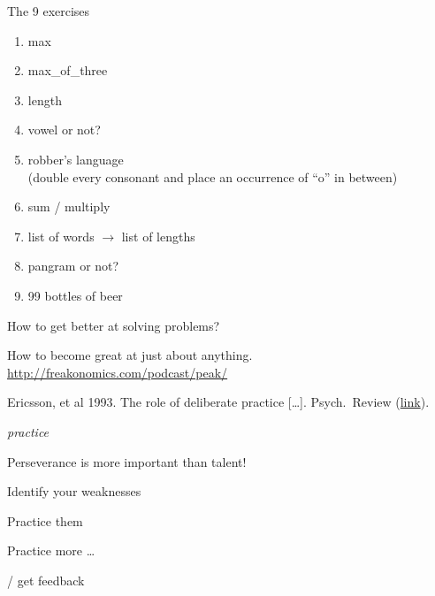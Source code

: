 \documentclass[aspectratio=169,usenames,dvipsnames]{beamer}
\begin{document}
\begin{frame}{The 9 exercises}
    \begin{enumerate}
        \item max
        \item max\_of\_three
        \item length
        \item vowel or not?
        \item robber's language \\
            (double every consonant and place an occurrence of ``o'' in between)
        \item sum / multiply
        \item list of words $\rightarrow$ list of lengths
        \item pangram or not?
        \item 99 bottles of beer
    \end{enumerate}
\end{frame}

\begin{frame}{How to get better at solving problems?}
    \begin{reference}
        How to become great at just about anything. \url{http://freakonomics.com/podcast/peak/}

        Ericsson, et al 1993. The role of deliberate practice [\dots]. Psych.\ Review
        (\href{http://graphics8.nytimes.com/images/blogs/freakonomics/pdf/DeliberatePractice(PsychologicalReview).pdf}{link}).
    \end{reference}
    {\centering\Huge\em
     practice}

    \pause\vspace{3em}
    Perseverance is more important than talent!

    \begin{description}[Dedication:]
        \item[Planning:] Identify your weaknesses
        \item[Dedication:] Practice them
        \item[Repetition:] Practice more \dots
        \item[Reflect] / get feedback
    \end{description}


\end{frame}
\end{document}
